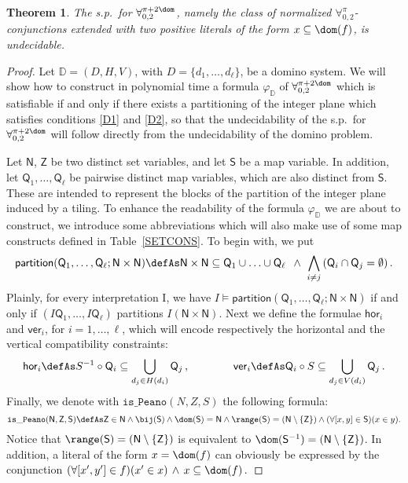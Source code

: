\documentclass[submission,copyright,creativecommons]{eptcs}
\newtheorem{theorem}{Theorem}
\newcommand{\Lang}{\ensuremath{\mathbf{\forall}^{\pi}_{0,2}}\xspace}
\newcommand{\inter}{I}
\newcommand{\Langdom}{\ensuremath{\mathbf{\forall}^{\pi +2 \dom}_{0,2}}\xspace}
\newcommand{\dominoSys}{\mathbb{D}}
\newcommand{\isPeanoSys}{\mathtt{is\_Peano}}
\newcommand{\isPartition}{\mathsf{partition}}
\newcommand{\mN}{\mathsf{N}}
\newcommand{\mQ}{\mathsf{Q}}
\newcommand{\mS}{\mathsf{S}}
\newcommand{\mZ}{\mathsf{Z}}
\newcommand{\horcom}{\mathsf{hor}}
\newcommand{\vercom}{\mathsf{ver}}
\newcommand{\svx}{x}
\newcommand{\svy}{y}
\newcommand{\mvx}{f}
\begin{document}
\begin{theorem}\label{PEANUNDEC}
The s.p.\ for $\Langdom$, namely the class of normalized
\Lang-conjunctions extended with two positive literals of the form $x
\subseteq \dom(\mvx)$, is undecidable.
\end{theorem}
\begin{proof}
Let $\dominoSys=(D,H,V)$, with $D=\{d_1, \ldots, d_\ell\}$, be a
domino system.  We will show how to construct in polynomial time a
formula $\varphi_{\dominoSys}$ of $\Langdom$ which is satisfiable if and only
if there exists a partitioning of the integer plane which satisfies
conditions \ref{D1} and \ref{D2}, so that the undecidability of the
s.p.\ for $\Langdom$ will follow directly from the undecidability
of the domino problem.

Let $\mN$, $\mZ$ be two distinct set variables, and let $\mS$ be a map
variable.  In addition, let $\mQ_{1}, \ldots, \mQ_{\ell}$ be pairwise
distinct map variables, which are also distinct from $\mS$.  These are
intended to represent the blocks of the partition of the integer plane
induced by a tiling.
To enhance the readability of the formula $\varphi_{\dominoSys}$ we are about to
construct, we introduce some abbreviations which will also make use 
of some map constructs defined in Table~\ref{SETCONS}. 
To begin with, we put
\[
  \isPartition(\mQ_1, \ldots, \mQ_\ell; \mN \times \mN) \defAs
  \mN \times \mN \subseteq \mQ_1 \cup \ldots \cup \mQ_\ell \,\,\, \wedge \,\,
  \bigwedge_{i\neq j} \left(\mQ_i \cap \mQ_j =
  \emptyset\right).
\]
Plainly, for every interpretation \inter, we have $\inter \models
\isPartition(\mQ_1, \ldots, \mQ_\ell; \mN \times \mN)$ if and only if
$(\inter \mQ_1, \ldots, \inter \mQ_\ell)$ partitions $\inter
(\mN \times \mN)$.
Next we define the formulae $\horcom_i$ and $\vercom_i$, for $i = 
1,\ldots,\ell$, which will encode respectively the horizontal and the
vertical compatibility constraints:
\[
  \horcom_i  \defAs  S^{-1} \circ \mQ_i \subseteq \bigcup_{d_{j} 
  \in H(d_{i})} \mQ_{j}\,, \qquad \qquad
  \vercom_i  \defAs  \mQ_i \circ S \subseteq \bigcup_{d_{j} 
  \in V(d_{i})} \mQ_{j}\,.
\]
Finally, we denote with $\isPeanoSys(N,Z,S)$ the following formula:
\[
  \isPeanoSys(\mN,\mZ,\mS) \defAs \mZ \in \mN \wedge \bij(\mS)
  \wedge \dom(\mS)=\mN \wedge \range(\mS) = (\mN \setminus \{\mZ\})
  \wedge (\forall [\svx, \svy] \in \mS)(\svx \in \svy).
\]
Notice that $\range(\mS) = (\mN \setminus \{\mZ\})$ is equivalent to
$\dom(\mS^{-1}) = (\mN \setminus \{\mZ\})$.  In addition, a literal of
the form $x = \dom(f)$ can obviously be expressed by the conjunction
$
(\forall [\svx', \svy'] \in \mvx)(\svx' \in \svx) \,\wedge \, x \subseteq
\dom(f)\,.
$



\end{proof}
\end{document}
